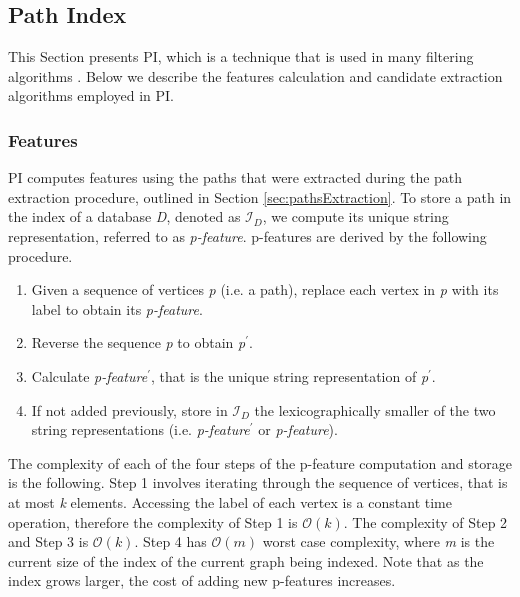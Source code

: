 \documentclass{l4proj}
\newcommand{\fancyI}{\mathcal{I}}
\begin{document}
\subsection{Path Index}
\label{sec:pi}
This Section presents PI, which is a technique that is used in many filtering algorithms \cite{graphgrepsx}. Below we describe the features calculation and candidate extraction algorithms employed in PI.

\subsubsection{Features}
\label{sec:pifeatures}
PI computes features using the paths that were extracted during the path extraction procedure, outlined in Section \ref{sec:pathsExtraction}. To store a path in the index of a database \emph{D}, denoted as $\fancyI_{D}$, we compute its unique string representation, referred to as \emph{p-feature}. p-features are derived by the following procedure.

\begin{enumerate}
\item Given a sequence of vertices \emph{p} (i.e. a path), replace each vertex in \emph{p} with its label to obtain its \emph{p-feature}.
\item Reverse the sequence \emph{p} to obtain \emph{p}$^{\prime}$.
\item Calculate \emph{p-feature}$^{\prime}$, that is the unique string representation of \emph{p}$^{\prime}$.
\item If not added previously, store in $\fancyI_{D}$ the lexicographically smaller of the two string representations (i.e. \emph{p-feature}$^{\prime}$ or \emph{p-feature}).
\end{enumerate}

The complexity of each of the four steps of the p-feature computation and storage is the following. Step 1 involves iterating through the sequence of vertices, that is at most \emph{k} elements. Accessing the label of each vertex is a constant time operation, therefore the complexity of Step 1 is $\mathcal{O}(k)$. The complexity of Step 2 and Step 3 is $\mathcal{O}(k)$. Step 4 has $\mathcal{O}(m)$ worst case complexity, where \emph{m} is the current size of the index of the current graph being indexed. Note that as the index grows larger, the cost of adding new p-features increases.
\end{document}

